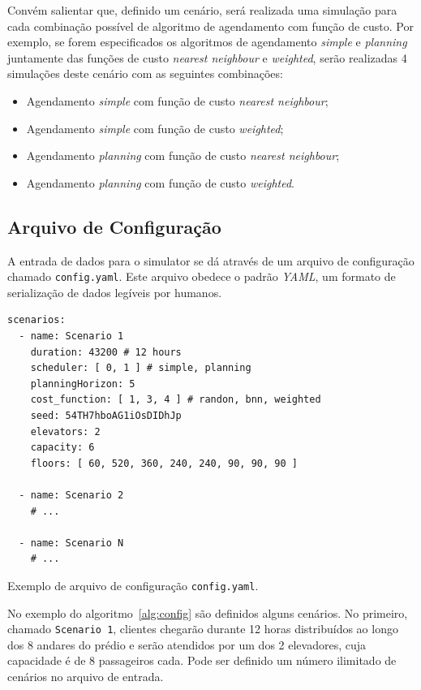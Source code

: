 Convém salientar que, definido um cenário, será realizada uma simulação para cada
combinação possível de algoritmo de agendamento com função de custo. Por
exemplo, se forem especificados os algoritmos de agendamento \textit{simple} e
\textit{planning} juntamente das funções de custo \textit{nearest neighbour} e
\textit{weighted}, serão realizadas 4 simulações deste cenário com as seguintes
combinações:

\begin{itemize}
  \item Agendamento \textit{simple} com função de custo \textit{nearest neighbour};
  \item Agendamento \textit{simple} com função de custo \textit{weighted};
  \item Agendamento \textit{planning} com função de custo \textit{nearest neighbour};
  \item Agendamento \textit{planning} com função de custo \textit{weighted}.
\end{itemize}

\subsection{\label{model:scenario:config}Arquivo de Configuração}

A entrada de dados para o simulator se dá através de um arquivo de configuração
chamado \texttt{config.yaml}. Este arquivo obedece o padrão \textit{YAML}, um
formato de serialização de dados legíveis por humanos.

\begin{algorithm}[htb]
  \centering
    \begin{verbatim}
scenarios:
  - name: Scenario 1
    duration: 43200 # 12 hours
    scheduler: [ 0, 1 ] # simple, planning
    planningHorizon: 5
    cost_function: [ 1, 3, 4 ] # randon, bnn, weighted
    seed: 54TH7hboAG1iOsDIDhJp
    elevators: 2
    capacity: 6
    floors: [ 60, 520, 360, 240, 240, 90, 90, 90 ]

  - name: Scenario 2
    # ...

  - name: Scenario N
    # ...
    \end{verbatim}
  \caption{Exemplo de arquivo de configuração \texttt{config.yaml}.}
  \label{alg:config}
\end{algorithm}

No exemplo do algoritmo~\ref{alg:config} são definidos alguns cenários. No
primeiro, chamado \texttt{Scenario 1}, clientes chegarão durante 12 horas
distribuídos ao longo dos 8 andares do prédio e serão atendidos por um dos 2
elevadores, cuja capacidade é de 8 passageiros cada. Pode ser definido um
número ilimitado de cenários no arquivo de entrada.

